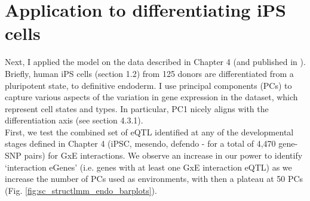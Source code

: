 



\clearpage

\section{Application to differentiating iPS cells}

Next, I applied the model on the data described in Chapter 
4 (and published in \cite{cuomo2020single}).
Briefly, human iPS cells (section 
1.2) from 125 donors are differentiated from a pluripotent state, to definitive endoderm. 
I use 
principal components (PCs) 
to capture various aspects of the variation in gene expression in the dataset, which represent cell states and types. 
In particular, PC1 nicely aligns with the differentiation axis (see section 
4.3.1). \\

First, we test the combined set of eQTL identified at any of the developmental stages defined in Chapter 
4 (iPSC, mesendo, defendo - for a total of 4,470 gene-SNP pairs) for GxE interactions.
We observe an increase in our power to identify `interaction eGenes' (i.e. genes with at least one GxE interaction eQTL) as we increase the number of PCs used as environments, with then a plateau at 50 PCs (Fig. \ref{fig:sc_structlmm_endo_barplots}).

